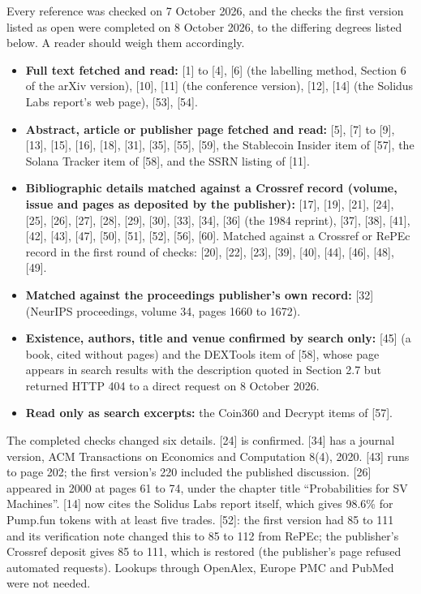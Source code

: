 Every reference was checked on 7 October 2026, and the checks the first version listed as open were completed on 8 October 2026, to the differing degrees listed below. A reader should weigh them accordingly.

\begin{itemize}
\tightlist
\item
  \textbf{Full text fetched and read:} {[}1{]} to {[}4{]}, {[}6{]} (the labelling method, Section 6 of the arXiv version), {[}10{]}, {[}11{]} (the conference version), {[}12{]}, {[}14{]} (the Solidus Labs report's web page), {[}53{]}, {[}54{]}.
\item
  \textbf{Abstract, article or publisher page fetched and read:} {[}5{]}, {[}7{]} to {[}9{]}, {[}13{]}, {[}15{]}, {[}16{]}, {[}18{]}, {[}31{]}, {[}35{]}, {[}55{]}, {[}59{]}, the Stablecoin Insider item of {[}57{]}, the Solana Tracker item of {[}58{]}, and the SSRN listing of {[}11{]}.
\item
  \textbf{Bibliographic details matched against a Crossref record (volume, issue and pages as deposited by the publisher):} {[}17{]}, {[}19{]}, {[}21{]}, {[}24{]}, {[}25{]}, {[}26{]}, {[}27{]}, {[}28{]}, {[}29{]}, {[}30{]}, {[}33{]}, {[}34{]}, {[}36{]} (the 1984 reprint), {[}37{]}, {[}38{]}, {[}41{]}, {[}42{]}, {[}43{]}, {[}47{]}, {[}50{]}, {[}51{]}, {[}52{]}, {[}56{]}, {[}60{]}. Matched against a Crossref or RePEc record in the first round of checks: {[}20{]}, {[}22{]}, {[}23{]}, {[}39{]}, {[}40{]}, {[}44{]}, {[}46{]}, {[}48{]}, {[}49{]}.
\item
  \textbf{Matched against the proceedings publisher's own record:} {[}32{]} (NeurIPS proceedings, volume 34, pages 1660 to 1672).
\item
  \textbf{Existence, authors, title and venue confirmed by search only:} {[}45{]} (a book, cited without pages) and the DEXTools item of {[}58{]}, whose page appears in search results with the description quoted in Section 2.7 but returned HTTP 404 to a direct request on 8 October 2026.
\item
  \textbf{Read only as search excerpts:} the Coin360 and Decrypt items of {[}57{]}.
\end{itemize}

The completed checks changed six details. {[}24{]} is confirmed. {[}34{]} has a journal version, ACM Transactions on Economics and Computation 8(4), 2020. {[}43{]} runs to page 202; the first version's 220 included the published discussion. {[}26{]} appeared in 2000 at pages 61 to 74, under the chapter title ``Probabilities for SV Machines''. {[}14{]} now cites the Solidus Labs report itself, which gives 98.6\% for Pump.fun tokens with at least five trades. {[}52{]}: the first version had 85 to 111 and its verification note changed this to 85 to 112 from RePEc; the publisher's Crossref deposit gives 85 to 111, which is restored (the publisher's page refused automated requests). Lookups through OpenAlex, Europe PMC and PubMed were not needed.


